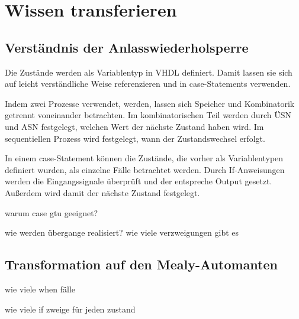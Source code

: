 \documentclass[
    paper=a4,
    parskip=half,
]{scrartcl}
\begin{document}
\section{Wissen transferieren}

    \subsection{Verständnis der Anlasswiederholsperre}
        Die Zustände werden als Variablentyp in VHDL definiert. Damit lassen sie sich auf leicht verständliche Weise referenzieren und in case-Statements verwenden.

        Indem zwei Prozesse verwendet, werden, lassen sich Speicher und Kombinatorik getrennt voneinander betrachten. Im kombinatorischen Teil werden durch ÜSN und ASN festgelegt, welchen Wert der nächste Zustand haben wird. Im sequentiellen Prozess wird festgelegt, wann der Zustandswechsel erfolgt.
        
        In einem case-Statement können die Zustände, die vorher als Variablentypen definiert wurden, als einzelne Fälle betrachtet werden. Durch If-Anweisungen werden die Eingangssignale überprüft und der entspreche Output gesetzt. Außerdem wird damit der nächste Zustand festgelegt.

        warum case gtu geeignet?

        wie werden übergange realisiert?
        wie viele verzweigungen gibt es

    \subsection{Transformation auf den Mealy-Automanten}

        wie viele when fälle

        wie viele if zweige für jeden zustand
\end{document}
